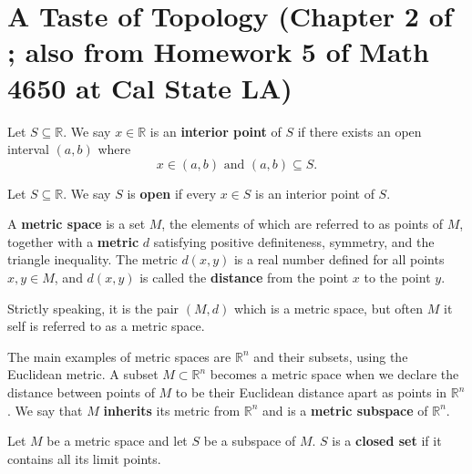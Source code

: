 \section{A Taste of Topology (Chapter 2 of \citet{pugh2015real}; also from Homework 5 of Math 4650 at Cal State LA)}

\begin{definition} Let \(S \subseteq \mathbb{R}\). We say \(x \in \mathbb{R}\) is an \textbf{interior point} of \(S\) if there exists an open interval \((a, b)\) where \[x \in (a, b) \text{ and } (a, b) \subseteq S.\]

\end{definition}

\begin{definition} Let \(S \subseteq \mathbb{R}\). We say \(S\) is \textbf{open} if every \(x \in S\) is an interior point of \(S\).

\end{definition}

\begin{definition}\label{ra.def.metric.space}

 A \textbf{metric space} is a set \(M\), the elements of which are referred to as points of \(M\), together with a \textbf{metric} \(d\) satisfying positive definiteness, symmetry, and the triangle inequality. The metric \(d(x,y)\) is a real number defined for all points \(x, y \in M\), and \(d(x,y)\) is called the \textbf{distance} from the point \(x\) to the point \(y\).

Strictly speaking, it is the pair \((M,d)\) which is a metric space, but often \(M\) it self is referred to as a metric space.

The main examples of metric spaces are \(\mathbb{R}^n\) and their subsets, using the Euclidean metric. A subset \(M \subset \mathbb{R}^n\) becomes a metric space when we declare the distance between points of \(M\) to be their Euclidean distance apart as points in \(\mathbb{R}^n\). We say that \(M\) \textbf{inherits} its metric from \(\mathbb{R}^n\) and is a \textbf{metric subspace} of \(\mathbb{R}^n\). 

\end{definition}



\begin{definition} Let \(M\) be a metric space and let \(S\) be a subspace of \(M\). \(S\) is a \textbf{closed set} if it contains all its limit points.

\end{definition}




